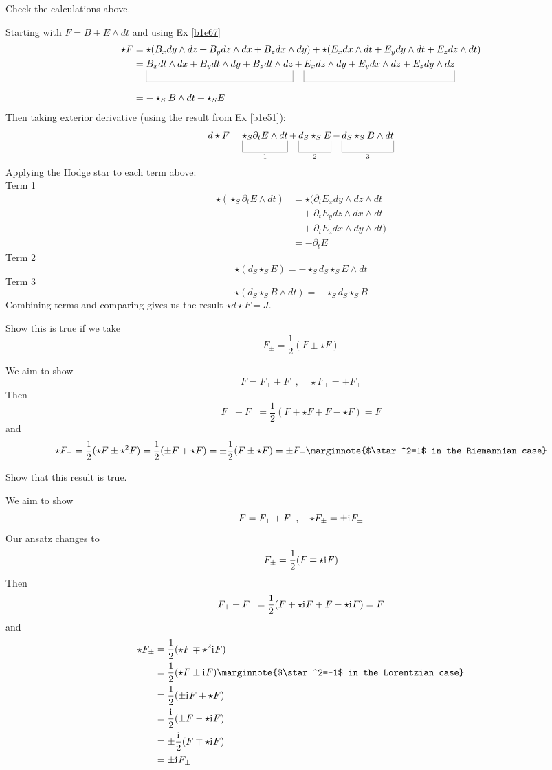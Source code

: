 \documentclass[10pt]{article}
\begin{document}
\begin{example}\label{b1e71}
	Check the calculations above.
\end{example}
\sol Starting with $F=B+E\wedge dt$ and using Ex \ref{b1e67}
$$
\begin{aligned}
	\star F &= \star(B_x dy \wedge dz + B_y dz \wedge dx + B_z dx \wedge dy)+\star(E_x dx \wedge dt + E_y dy \wedge dt + E_z dz\wedge dt)\\
	&= \ub{B_x dt \wedge dx + B_y dt \wedge dy + B_z dt \wedge dz}{} + \ub{E_x dz \wedge dy + E_y dx \wedge dz + E_z dy \wedge dz}{}\\
	&= -\star_SB \wedge dt + \star_SE
\end{aligned}
$$
Then taking exterior derivative (using the result from Ex \ref{b1e51}):
$$
	d\star F = \ub{\star_S\partial_tE\wedge dt}{1}+\ub{d_S\star_SE}{2}-\ub{d_S\star_SB\wedge dt}{3}
$$
Applying the Hodge star to each term above:\\
\underline{Term 1}
$$
\begin{aligned}
	\star(\star_S\partial_tE\wedge dt) &= \star(\partial_t E_x dy \wedge dz \wedge dt\\
	&\quad+\partial_t E_y dz \wedge dx \wedge dt\\
	&\quad+\partial_t E_z dx \wedge dy \wedge dt)\\
	&= -\partial_t E
\end{aligned}
$$
\underline{Term 2}
$$
	\star(d_S\star_SE) = -\star_Sd_S\star_SE \wedge dt
$$
\underline{Term 3}
$$
\star(d_S\star_SB\wedge dt) = -\star_Sd_S\star_SB
$$
Combining terms and comparing gives us the result $\star d\star F = J$.


\begin{example}
	Show this is true if we take
	$$
		F_\pm = \frac12 (F \pm \star F)
	$$
\end{example}
\sol We aim to show
$$
F = F_+ + F_-, \quad \star F_\pm = \pm F_\pm
$$
Then
$$
F_+ + F_- = \frac12(F + \star F + F - \star F) = F
$$
and
$$
\star F_\pm = \frac12(\star F \pm \star^2 F) = \frac12(\pm F + \star F) = \pm \frac12(F \pm \star F) = \pm F_\pm\marginnote{$\star^2=1$ in the Riemannian case}
$$


\begin{example}
	Show that this result is true.
\end{example}
\sol We aim to show
$$
F = F_+ + F_-, \quad \star F_\pm = \pm \mathrm{i}\mkern1mu F_\pm
$$
Our ansatz changes to
$$
	F_\pm = \frac12 (F \mp \star \mathrm{i}\mkern1mu F)
$$
Then
$$
F_+ + F_- = \frac12(F + \star \mathrm{i}\mkern1mu F + F - \star \mathrm{i}\mkern1mu F) = F
$$
and
$$
\begin{aligned}
	\star F_\pm &= \frac12(\star F \mp \star^2 \di F)\\
	&= \frac12(\star F \pm \di F)\marginnote{$\star^2=-1$ in the Lorentzian case}\\
	&= \frac12(\pm \di F + \star F)\\
	&= \frac{\di}{2}(\pm F - \star \di F)\\
	&= \pm \frac{\di}{2}(F \mp \star \di F)\\
	&= \pm \di F_\pm
\end{aligned}
$$
\end{document}
